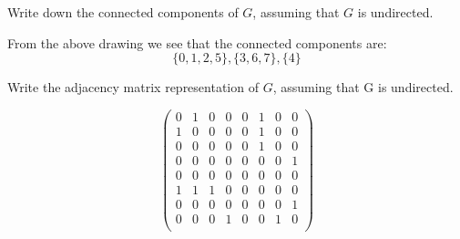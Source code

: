 \begin{prob}
\begin{subprobset}
\begin{subprob}
\begin{soln}
\begin{center}
                \end{center}

            \end{soln}
        \end{subprob}

        \begin{subprob}
            Write down the connected components of $G$, assuming that $G$ is undirected.

            \begin{soln}
                From the above drawing we see that the connected components
                are:
                \[
                    \{0, 1, 2, 5\}, \{3, 6, 7\}, \{4\}
                \]
            \end{soln}
            
        \end{subprob}

        \begin{subprob}
            Write the adjacency matrix representation of $G$, assuming that G is undirected.

            \begin{soln}

                \[
                \begin{pmatrix}
                    0 & 1 & 0 & 0 & 0 & 1 & 0 & 0\\
                    1 & 0 & 0 & 0 & 0 & 1 & 0 & 0\\
                    0 & 0 & 0 & 0 & 0 & 1 & 0 & 0\\
                    0 & 0 & 0 & 0 & 0 & 0 & 0 & 1\\
                    0 & 0 & 0 & 0 & 0 & 0 & 0 & 0\\
                    1 & 1 & 1 & 0 & 0 & 0 & 0 & 0\\
                    0 & 0 & 0 & 0 & 0 & 0 & 0 & 1\\
                    0 & 0 & 0 & 1 & 0 & 0 & 1 & 0\\
                \end{pmatrix}
                \]


\end{soln}
\end{subprob}
\end{subprobset}
\end{prob}
